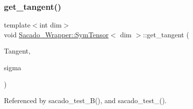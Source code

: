 \subsubsection{\texorpdfstring{get\+\_\+tangent()}{get\_tangent()}\hspace{0.1cm}{\footnotesize\ttfamily [1/2]}}
{\footnotesize\ttfamily template$<$int dim$>$ \\
void \hyperlink{classSacado__Wrapper_1_1SymTensor}{Sacado\+\_\+\+Wrapper\+::\+Sym\+Tensor}$<$ dim $>$\+::get\+\_\+tangent (\begin{DoxyParamCaption}\item[{Symmetric\+Tensor$<$ 4, dim $>$ \&}]{Tangent,  }\item[{Symmetric\+Tensor$<$ 2, dim, \hyperlink{Sacado__example_8cc_a868b94676739e612d9c95940e70892a9}{fad\+\_\+double} $>$ \&}]{sigma }\end{DoxyParamCaption})}



Referenced by sacado\+\_\+test\+\_\+B(), and sacado\+\_\+test\+\_().


